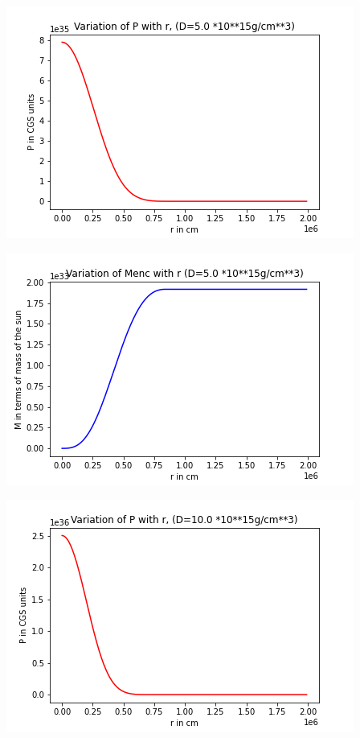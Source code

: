 \documentclass{article}
\begin{document}
\begin{center}
\begin{multicols}{2}
\end{multicols}
\begin{multicols}{2}
	\begin{center}
        \includegraphics[scale=0.3]{Images/Pr_pb2_3}
        \end{center}
\columnbreak
       \includegraphics[scale=0.3]{Images/Mr_pb2_3}
\end{multicols}
\begin{multicols}{2}
	\begin{center}
        \includegraphics[scale=0.3]{Images/Pr_pb2_4}

\end{center}
\end{multicols}
\end{center}
\end{document}
